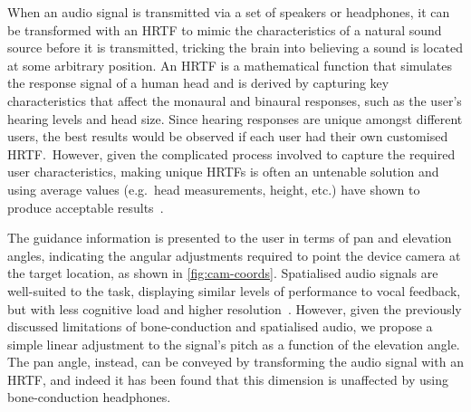 \documentclass{article}
\begin{document}
When an audio signal is transmitted via a set of speakers or headphones, it can be transformed with an HRTF to mimic the characteristics of a natural sound source before it is transmitted, tricking the brain into believing a sound is located at some arbitrary position.
An HRTF is a mathematical function that simulates the response signal of a human head and is derived by capturing key characteristics that affect the monaural and binaural responses, such as the user's hearing levels and head size.
Since hearing responses are unique amongst different users, the best results would be observed if each user had their own customised HRTF.\
However, given the complicated process involved to capture the required user characteristics, making unique HRTFs is often an untenable solution and using average values (e.g.\ head measurements, height, etc.) have shown to produce acceptable results~\cite{gardner1995hrtf}.

The guidance information is presented to the user in terms of pan and elevation angles, indicating the angular adjustments required to point the device camera at the target location, as shown in \cref{fig:cam-coords}.
Spatialised audio signals are well-suited to the task, displaying similar levels of performance to vocal feedback, but with less cognitive load and higher resolution~\cite{klatzky2006cognitive}.
However, given the previously discussed limitations of bone-conduction and spatialised audio, we propose a simple linear adjustment to the signal's pitch as a function of the elevation angle. 
The pan angle, instead, can be conveyed by transforming the audio signal with an HRTF, and indeed it has been found that this dimension is unaffected by using bone-conduction headphones\cite{schonstein2008comparison,macdonald2006spatial,stanley2006lateralization}. 
\end{document}
